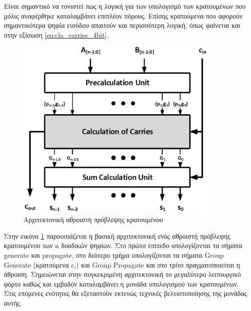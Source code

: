 Είναι σημαντικό να τονιστεί πως η λογική για των υπολογισμό των κρατουμένων που μόλις αναφέρθηκε καταλαμβάνει επιπλέον πόρους. Επίσης κρατούμενα που αφορούν σημαντικότερα ψηφία εισόδου απαιτούν και περισσότερη λογική, όπως φαίνεται και στην εξίσωση \ref{eq:cla_carries_4bit}.


\begin{figure}[H]
    \centering
    \includegraphics[height=9cm,width=10cm]{Pictures/CLA_Architecture.png}
    \caption{Αρχιτεκτονική αθροιστή πρόβλεψης κρατουμένου}
    \label{cla_architecture}
\end{figure}

Στην εικόνα \ref{cla_architecture} παρουσιάζεται η βασική αρχιτεκτονική ενός αθροιστή πρόβλεψης κρατουμένου των n δυαδικών ψηφίων. Στο πρώτο επίπεδο υπολογίζονται τα σήματα generate και propagate, στο δεύτερο τμήμα υπολογίζονται τα σήματα Group Generate (κρατούμενα $c_i$) και Group Propagate και στο τρίτο πραγματοποιείται η άθροιση. Σημειώνεται στην συγκεκριμένη αρχιτεκτονική το μεγαλύτερο λειτουργικό φόρτο καθώς και εμβαδόν καταλαμβάνει η μονάδα υπολογισμού των κρατουμένων. Στις επόμενες ενότητες θα εξεταστούν εκτενώς τεχνικές βελτιστοποίησης της μονάδας αυτής.
